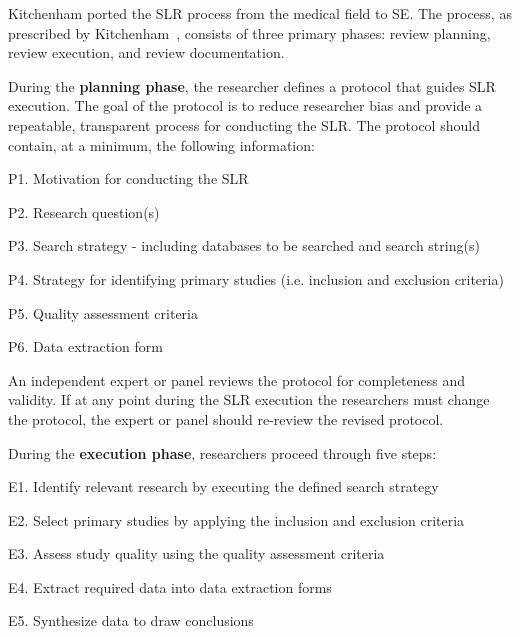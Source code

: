
Kitchenham ported the SLR process from the medical field to SE. The process, as prescribed by Kitchenham~\cite{Kitchenham:04,Kitchenham_Charters:07}, consists of three primary phases: review planning, review execution, and review documentation.

During the \textbf{planning phase}, the researcher defines a protocol that guides SLR execution. The goal of the protocol is to reduce researcher bias and provide a repeatable, transparent process for conducting the SLR. The protocol should contain, at a minimum, the following information:
\begin{enumerate*}
	\item[P1.]{Motivation for conducting the SLR}
	\item[P2.]{Research question(s)}
	\item[P3.]{Search strategy - including databases to be searched and search string(s)}
	\item[P4.]{Strategy for identifying primary studies (i.e. inclusion and exclusion criteria)}
	\item[P5.]{Quality assessment criteria}
	\item[P6.]{Data extraction form}
\end{enumerate*}
\vspace*{-8pt}

An independent expert or panel reviews the protocol for completeness and validity. If at any point during the SLR execution the researchers must change the protocol, the expert or panel should re-review the revised protocol.

During the \textbf{execution phase}, researchers proceed through five steps:
\begin{enumerate*}
	\item[E1.]{Identify relevant research by executing the defined search strategy}
	\item[E2.]{Select primary studies by applying the inclusion and exclusion criteria}
	\item[E3.]{Assess study quality using the quality assessment criteria}
	\item[E4.]{Extract required data into data extraction forms}
	\item[E5.]{Synthesize data to draw conclusions}
\end{enumerate*}
\vspace*{-8pt}

